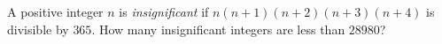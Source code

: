 A positive integer $n$ is \emph{insignificant} if $n(n+1)(n+2)(n+3)(n+4)$ is divisible by $365$. How many insignificant integers are less than $28980$?
